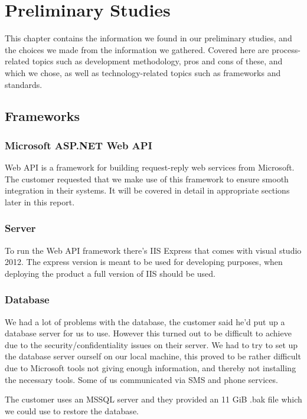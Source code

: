 \chapter{Preliminary Studies}
This chapter contains the information we found in our preliminary studies, and the choices we made from the information we gathered. Covered here are process-related topics such as development methodology, pros and cons of these, and which we chose, as well as technology-related topics such as frameworks and standards.
\newpage


\newpage

\section{Frameworks}
\subsection{Microsoft ASP.NET Web API}
Web API is a framework for building request-reply web services from Microsoft. The customer requested that we make use of this framework to ensure smooth integration in their systems. It will be covered in detail in appropriate sections later in this report. 

\subsection{Server}
To run the Web API framework there's IIS Express that comes with visual studio 2012. The express version is meant to be used for developing purposes, when deploying the product a full version of IIS should be used.
\subsection{Database}
We had a lot of problems with the database, the customer said he'd put up a database server for us to use. However this turned out to be difficult to achieve due to the security/confidentiality issues on their server. We had to try to set up the database server ourself on our local machine, this proved to be rather difficult due to Microsoft tools not giving enough information, and thereby not installing the necessary tools. Some of us communicated via SMS and phone services.

The customer uses an MSSQL server and they provided an 11 GiB .bak file which we could use to restore the database.

